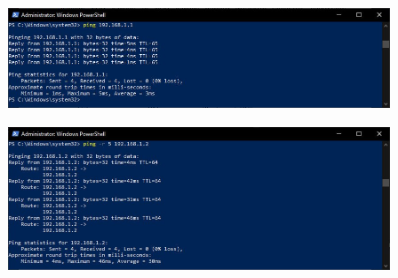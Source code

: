 \documentclass[12pt]{extarticle}
\begin{document}
\begin{figure}[H]
    \centering
    \includegraphics[width=0.90\textwidth]{ping_gateway.jpg}
    \caption{}
\end{figure}

\begin{figure}[H]
    \centering
    \includegraphics[width=0.90\textwidth]{ping-r.jpg}
    \caption{}
\end{figure}
\end{document}
